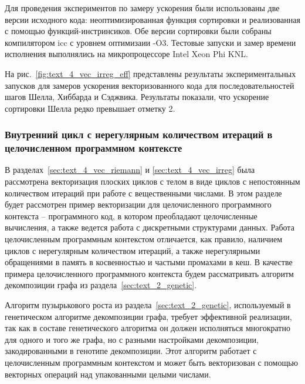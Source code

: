 Для проведения экспериментов по замеру ускорения были использованы две версии исходного кода: неоптимизированная функция сортировки и реализованная с помощью функций-инстринсиков.
Обе версии сортировки были собраны компилятором icc с уровнем оптимизаии -O3.
Тестовые запуски и замер времени исполнения выполнялись на микропроцессоре Intel Xeon Phi KNL\label{abbr:knl-11}.

На рис.~\ref{fig:text_4_vec_irreg_eff} представлены результаты экспериментальных запусков для замеров ускорения векторизованного кода для последовательностей шагов Шелла, Хиббарда и Сэджвика.
Результаты показали, что ускорение сортировки Шелла редко превышает отметку 2.


\subsubsection{Внутренний цикл с нерегулярным количеством итераций в целочисленном программном контексте}\label{sec:text_4_integer}

В разделах~\ref{sec:text_4_vec_riemann} и \ref{sec:text_4_vec_irreg} была рассмотрена векторизация плоских циклов с телом в виде циклов с непостоянным количеством итераций при работе с вещественными числами.
В этом разделе будет рассмотрен пример векторизации для целочисленного программного контекста -- программного код, в котором преобладают целочисленные вычисления, а также ведется работа с дискретными структурами данных.
Работа целочисленным программным контекстом отличается, как правило, наличием циклов с нерегулярным количеством итераций, а также нерегулярными обращениями в память в косвенностью и частыми промахами в кеш.
В качестве примера целочисленного программного контекста будем рассматривать алгоритм декомпозиции графа из раздела~\ref{sec:text_2_genetic}.

Алгоритм пузырькового роста из раздела~\ref{sec:text_2_genetic}, используемый в генетическом алгоритме декомпозиции графа, требует эффективной реализации, так как в составе генетического алгоритма он должен исполняться многократно для одного и того же графа, но с разными настройками декомпозиции, закодированными в генотипе декомпозиции.
Этот алгоритм работает с целочисленным программным контекстом и может быть векторизован с помощью векторных операций над упакованными целыми числами.

